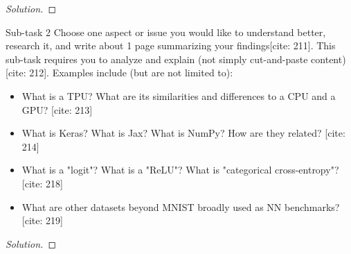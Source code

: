 \documentclass[12pt]{article}
\begin{document}
\begin{proof}[Solution]
\end{proof}

\begin{problem}{Sub-task 2}
Choose one aspect or issue you would like to understand better, research it, and write about 1 page summarizing your findings[cite: 211]. This sub-task requires you to analyze and explain (not simply cut-and-paste content)[cite: 212]. Examples include (but are not limited to):
\begin{itemize}
    \item What is a TPU? What are its similarities and differences to a CPU and a GPU? [cite: 213]
    \item What is Keras? What is Jax? What is NumPy? How are they related? [cite: 214]
    \item What is a "logit"? What is a "ReLU"? What is "categorical cross-entropy"? [cite: 218]
    \item What are other datasets beyond MNIST broadly used as NN benchmarks? [cite: 219]
\end{itemize}
\end{problem}

\begin{proof}[Solution]
\end{proof}
\end{document}
